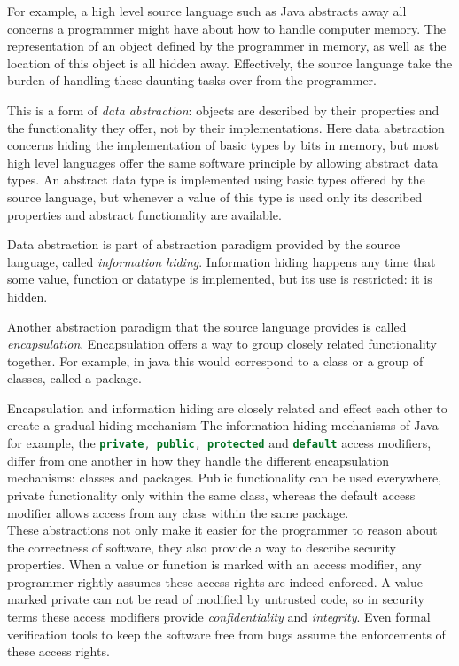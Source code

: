 For example, a high level source language such as Java abstracts away all concerns a programmer might have about how to handle computer memory.
The representation of an object defined by the programmer in memory, as well as the location of this object is all hidden away.
Effectively, the source language take the burden of handling these daunting tasks over from the programmer.

This is a form of \emph{data abstraction}: objects are described by their properties and the functionality they offer, not by their implementations.
Here data abstraction concerns hiding the implementation of basic types by bits in memory, but most high level languages offer the same software principle by allowing abstract data types. 
An abstract data type is implemented using basic types offered by the source language, but whenever a value of this type is used only its described properties and abstract functionality are available.

Data abstraction is part of abstraction paradigm provided by the source language, called \emph{information hiding}.
Information hiding happens any time that some value, function or datatype is implemented, but its use is restricted: it is hidden.

Another abstraction paradigm that the source language provides is called \emph{encapsulation}.
Encapsulation offers a way to group closely related functionality together. For example, in java this would correspond to a class or a group of classes, called a package.

Encapsulation and information hiding are closely related and effect each other to create a gradual hiding mechanism
The information hiding mechanisms of Java for example, the \lstinline[language=Java]{private, public, protected} and \lstinline[language=Java]{default} access modifiers, differ from one another in how they handle the different encapsulation mechanisms: classes and packages.
Public functionality can be used everywhere, private functionality only within the same class, whereas the default access modifier allows access from any class within the same package.
\\[1em]
These abstractions not only make it easier for the programmer to reason about the correctness of software, they also provide a way to describe security properties.
When a value or function is marked with an access modifier, any programmer rightly assumes these access rights are indeed enforced.
A value marked private can not be read of modified by untrusted code, so in security terms these access modifiers provide \emph{confidentiality} and \emph{integrity}.
Even formal verification tools to keep the software free from bugs assume the enforcements of these access rights.

